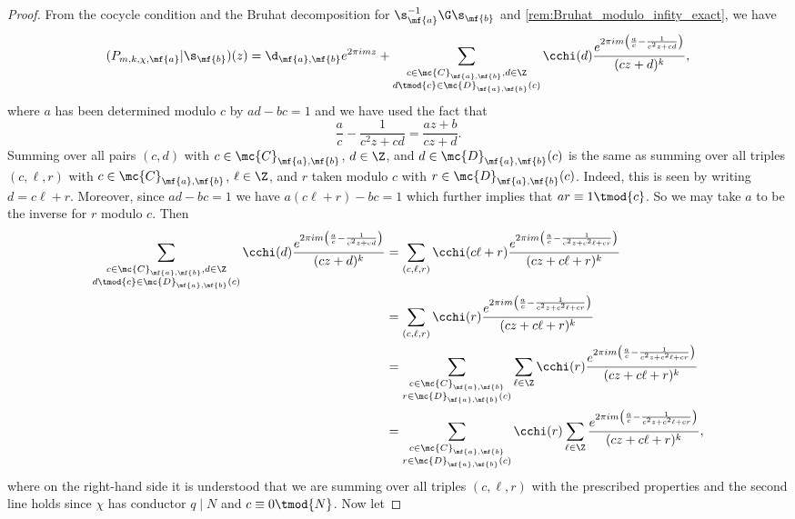    \begin{proof}
      From the cocycle condition and the Bruhat decomposition for $\s_{\mf{a}}^{-1}\G\s_{\mf{b}}$ and \cref{rem:Bruhat_modulo_infity_exact}, we have
      \[
        (P_{m,k,\chi,\mf{a}}|\s_{\mf{b}})(z) = \d_{\mf{a},\mf{b}}e^{2\pi imz}+\sum_{\substack{c \in \mc{C}_{\mf{a},\mf{b}}, d \in \Z \\ d \tmod{c} \in \mc{D}_{\mf{a},\mf{b}}(c)}}\cchi(d)\frac{e^{2\pi im\left(\frac{a}{c}-\frac{1}{c^{2}z+cd}\right)}}{(cz+d)^{k}},
      \]
      where $a$ has been determined modulo $c$ by $ad-bc = 1$ and we have used the fact that
      \[
        \frac{a}{c}-\frac{1}{c^{2}z+cd} = \frac{az+b}{cz+d}.
      \]
      Summing over all pairs $(c,d)$ with $c \in \mc{C}_{\mf{a},\mf{b}}$, $d \in \Z$, and $d \in \mc{D}_{\mf{a},\mf{b}}(c)$ is the same as summing over all triples $(c,\ell,r)$ with $c \in \mc{C}_{\mf{a},\mf{b}}$, $\ell \in \Z$, and $r$ taken modulo $c$ with $r \in \mc{D}_{\mf{a},\mf{b}}(c)$. Indeed, this is seen by writing $d = c\ell+r$. Moreover, since $ad-bc = 1$ we have $a(c\ell+r)-bc = 1$ which further implies that $ar \equiv 1 \tmod{c}$. So we may take $a$ to be the inverse for $r$ modulo $c$. Then
      \begin{align*}
        \sum_{\substack{c \in \mc{C}_{\mf{a},\mf{b}}, d \in \Z \\ d \tmod{c} \in \mc{D}_{\mf{a},\mf{b}}(c)}}\cchi(d)\frac{e^{2\pi im\left(\frac{a}{c}-\frac{1}{c^{2}z+cd}\right)}}{(cz+d)^{k}} &= \sum_{(c,\ell,r)}\cchi(c\ell+r)\frac{e^{2\pi im\left(\frac{a}{c}-\frac{1}{c^{2}z+c^{2}\ell+cr}\right)}}{(cz+c\ell+r)^{k}} \\
        &= \sum_{(c,\ell,r)}\cchi(r)\frac{e^{2\pi im\left(\frac{a}{c}-\frac{1}{c^{2}z+c^{2}\ell+cr}\right)}}{(cz+c\ell+r)^{k}} \\
        &= \sum_{\substack{c \in \mc{C}_{\mf{a},\mf{b}} \\ r \in \mc{D}_{\mf{a},\mf{b}}(c)}}\sum_{\ell \in \Z}\cchi(r)\frac{e^{2\pi im\left(\frac{a}{c}-\frac{1}{c^{2}z+c^{2}\ell+cr}\right)}}{(cz+c\ell+r)^{k}} \\
        &= \sum_{\substack{c \in \mc{C}_{\mf{a},\mf{b}} \\ r \in \mc{D}_{\mf{a},\mf{b}}(c)}}\cchi(r)\sum_{\ell \in \Z}\frac{e^{2\pi im\left(\frac{a}{c}-\frac{1}{c^{2}z+c^{2}\ell+cr}\right)}}{(cz+c\ell+r)^{k}},
      \end{align*}
      where on the right-hand side it is understood that we are summing over all triples $(c,\ell,r)$ with the prescribed properties and the second line holds since $\chi$ has conductor $q \mid N$ and $c \equiv 0 \tmod{N}$. Now let

\end{proof}
